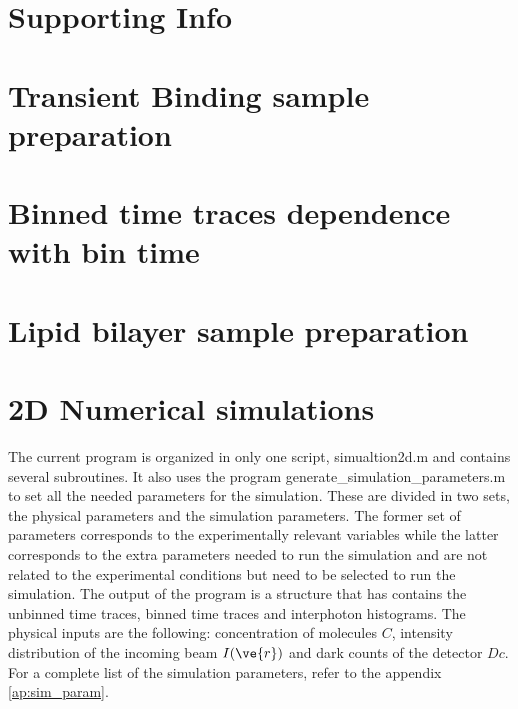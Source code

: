 \section{Supporting Info}
\graphicspath{{./chapters/c3_binfree/si_figure/}}
\section*{Transient Binding sample preparation}


\section*{Binned time traces dependence with bin time}



\section*{Lipid bilayer sample preparation}



\section*{2D Numerical simulations}

The current program is organized in only one script, simualtion2d.m and contains several subroutines. It also uses the program generate\_simulation\_parameters.m to set all the needed parameters for the simulation. These are divided in two sets, the physical parameters and the simulation parameters. 
The former set of parameters corresponds to the experimentally relevant variables while the latter corresponds to the extra parameters needed to run the simulation and are not related to the experimental conditions but need to be selected to run the simulation. 
The output of the program is a structure that has contains the unbinned time traces, binned time traces and interphoton histograms. The physical inputs are the following: concentration of molecules $C$, intensity distribution of the incoming beam $I(\ve{r})$ and dark counts of the detector $Dc$. 
For a complete list of the simulation parameters, refer to the appendix \ref{ap:sim_param}.

